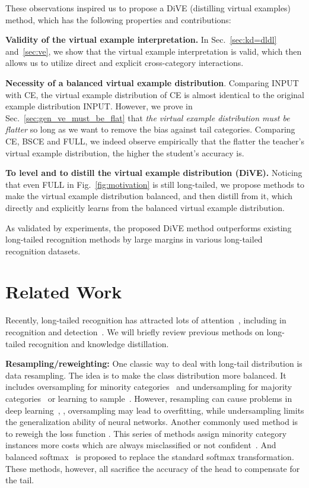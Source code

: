 \documentclass[10pt,twocolumn,letterpaper]{article}
\newcommand{\squishlist}{
	\begin{list}{}
		{ \setlength{\itemsep}{0pt}
			\setlength{\parsep}{1pt}
			\setlength{\topsep}{1pt}
			\setlength{\partopsep}{0pt}
			\setlength{\leftmargin}{1.5em}
			\setlength{\labelwidth}{1em}
			\setlength{\labelsep}{0.5em} } }
\newcommand{\squishend}{\end{list} 
}
\begin{document}
These observations inspired us to propose a DiVE (distilling virtual examples) method, which has the following properties and contributions:
\squishlist
	\item \textbf{Validity of the virtual example interpretation.} In Sec.~\ref{sec:kd=dldl} and~\ref{sec:ve}, we show that the virtual example interpretation is valid, which then allows us to utilize direct and explicit cross-category interactions.
	\item \textbf{Necessity of a balanced virtual example distribution}. Comparing INPUT with CE, the virtual example distribution of CE is almost identical to the original example distribution INPUT. However, we prove in Sec.~\ref{sec:gen_ve_must_be_flat} that \emph{the virtual example distribution must be flatter} so long as we want to remove the bias against tail categories. Comparing CE, BSCE and FULL, we indeed observe empirically that the flatter the teacher's virtual example distribution, the higher the student's accuracy is.
	\item \textbf{To level and to distill the virtual example distribution (DiVE).} Noticing that even FULL in Fig.~\ref{fig:motivation} is still long-tailed, we propose methods to make the virtual example distribution balanced, and then distill from it, which directly and explicitly learns from the balanced virtual example distribution.
\squishend
	
As validated by experiments, the proposed DiVE method outperforms existing long-tailed recognition methods by large margins in various long-tailed recognition datasets.

\section{Related Work}\label{sec:related}

Recently, long-tailed recognition has attracted lots of attention~\cite{cao2019LDAM,zhou2020BBN,cui2019classbalance,kang2019decoupling, tang2020longtailed}, including in recognition and detection~\cite{lin2017focal,tan2020equalization}. We will briefly review previous methods on long-tailed recognition and knowledge distillation.

\textbf{Resampling/reweighting:} One classic way to deal with long-tail distribution is data resampling. The idea is to make the class distribution more balanced. It includes oversampling for minority categories~\cite{chawla2002smote, han2005borderline, shen2016relay} and undersampling for majority categories~\cite{he2009learning, drummond2003c4} or learning to sample~\cite{ren2020BALMS}. However, resampling can cause problems in deep learning~\cite{chawla2002smote, cui2019classbalance}, \eg, oversampling may lead to overfitting, while undersampling limits the generalization ability of neural networks. Another commonly used method is to reweigh the loss function \cite{menon2020long}. This series of methods assign minority category instances more costs which are always misclassified or not confident~\cite{huang2016learning, cui2019classbalance, cao2019LDAM, lin2017focal}. And balanced softmax~\cite{ren2020BALMS} is proposed to replace the standard softmax transformation. These methods, however, all sacrifice the accuracy of the head to compensate for the tail.
\end{document}
